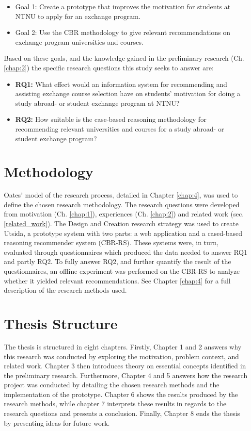 \begin{itemize}[noitemsep]
    \item Goal 1: Create a prototype that improves the motivation for students at NTNU to apply for an exchange program.
    \item Goal 2: Use the CBR methodology to give relevant recommendations on exchange program universities and courses.
\end{itemize}

Based on these goals, and the knowledge gained in the preliminary research (Ch. \ref{chap:2}) the specific research questions this study seeks to answer are:

\begin{itemize}
    \item \textbf{RQ1:} What effect would an information system for recommending and assisting exchange course selection have on students' motivation for doing a study abroad- or student exchange program at NTNU?
    \item \textbf{RQ2:} How suitable is the case-based reasoning methodology for recommending relevant universities and courses for a study abroad- or student exchange program?
\end{itemize}


\section{Methodology}
Oates' \cite{oates2005researching} model of the research process, detailed in Chapter \ref{chap:4}, was used to define the chosen research methodology. The research questions were developed from motivation (Ch. \ref{chap:1}), experiences (Ch. \ref{chap:2}) and related work (sec. \ref{related_work}). The Design and Creation research strategy was used to create Utsida, a prototype system with two parts: a web application and a cased-based reasoning recommender system (CBR-RS). These systems were, in turn, evaluated through questionnaires which produced the data needed to answer RQ1 and partly RQ2. To fully answer RQ2, and further quantify the result of the questionnaires, an offline experiment was performed on the CBR-RS to analyze whether it yielded relevant recommendations. See Chapter \ref{chap:4} for a full description of the research methods used.
    

\section{Thesis Structure}
The thesis is structured in eight chapters. Firstly, Chapter 1 and 2 answers why this research was conducted by exploring the motivation, problem context, and related work. Chapter 3 then introduces theory on essential concepts identified in the preliminary research. Furthermore, Chapter 4 and 5 answers how the research project was conducted by detailing the chosen research methods and the implementation of the prototype. Chapter 6 shows the results produced by the research methods, while chapter 7 interprets these results in regards to the research questions and presents a conclusion. Finally, Chapter 8 ends the thesis by presenting ideas for future work. 

